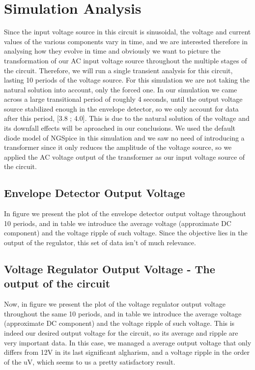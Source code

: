 \newpage
\section{Simulation Analysis}
\label{sec:simulation}
Since the input voltage source in this circuit is sinusoidal, the voltage and current values of the various components vary in time, and we are interested therefore in analysing how they evolve in time and obviously we want to picture the transformation of our AC input voltage source throughout the multiple stages of the circuit. Therefore, we will run a single transient analysis for this circuit, lasting 10 periods of the voltage source. For this simulation we are not taking the natural solution into account, only the forced one. In our simulation we came across a large transitional period of roughly 4 seconds, until the output voltage source stabilized enough in the envelope detector, so we only account for data after this period, [3.8 ; 4.0]. This is due to the natural solution of the voltage and its downfall effects will be aproached in our conclusions. We used the default diode model of NGSpice in this simulation and we saw no need of introducing a transformer since it only reduces the amplitude of the voltage source, so we applied the AC voltage output of the transformer as our input voltage source of the circuit.
\subsection{Envelope Detector Output Voltage}
In figure we present the plot of the envelope detector output voltage throughout 10 periods, and in table we introduce the average voltage (approximate DC component) and the voltage ripple of such voltage. Since the objective lies in the output of the regulator, this set of data isn't of much relevance.

\subsection{Voltage Regulator Output Voltage - The output of the circuit}
Now, in figure we present the plot of the voltage regulator output voltage throughout the same 10 periods, and in table we introduce the average voltage (approximate DC component) and the voltage ripple of such voltage. This is indeed our desired output voltage for the circuit, so its average and ripple are very important data. In this case, we managed a average output voltage that only differs from 12V in its last significant algharism, and a voltage ripple in the order of the uV, which seems to us a pretty satisfactory result.

